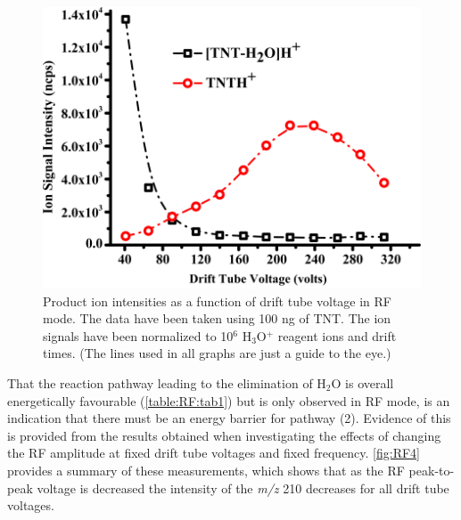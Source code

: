 \begin{figure}%
\centering
\includegraphics[height=0.3\textheight]{pics/RFpaper_fig3.png}
\caption{Product ion intensities as a function of drift tube voltage in RF mode. The data have been taken using 100 ng of TNT. The ion signals have been normalized to 10$^6$ H$_3$O$^+$ reagent ions and drift times. (The lines used in all graphs are just a guide to the eye.)}
\label{fig:RF3}
\end{figure}

That the reaction pathway leading to the elimination of H$_2$O is overall energetically favourable (\autoref{table:RF:tab1}) but is only observed in RF mode, is an indication that there must be an energy barrier for pathway (2). Evidence of this is provided from the results obtained when investigating the effects of changing the RF amplitude at fixed drift tube voltages and fixed frequency. \autoref{fig:RF4} provides a summary of these measurements, which shows that as the RF peak-to-peak voltage is decreased the intensity of the \textit{m/z} 210 decreases for all drift tube voltages.

